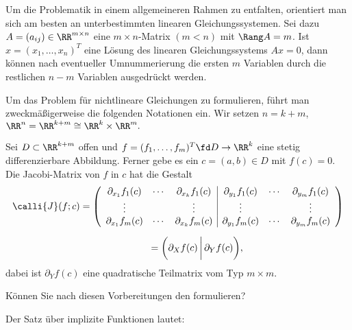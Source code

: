 Um die Problematik in einem allgemeineren Rahmen zu entfalten,   
orientiert man sich am besten an unterbestimmten 
linearen Gleichungssystemen. Sei dazu $A=(a_{ij})\in \RR^{m\times n}$ 
eine $m\times n$-Matrix $(m<n)$ mit $\Rang A =m$. 
Ist $x=(x_1,\ldots,x_n)^T$ eine Lösung des linearen Gleichungssystems 
$Ax=0$, dann können nach eventueller Umnummerierung die ersten $m$ Variablen 
durch die restlichen $n-m$ Variablen ausgedrückt werden. 

Um das Problem für nichtlineare Gleichungen zu formulieren, führt 
man zweckmäßigerweise die folgenden Notationen ein. 
Wir setzen $n=k+m$, $\RR^n =\RR^{k+m} \cong \RR^k \times \RR^m.$ 

Sei $D\subset \RR^{k+m}$ offen und 
$f =(f_1,\ldots,f_m)^T \fd D\to\RR^k$ eine stetig differenzierbare 
Abbildung. Ferner gebe es ein $c =(a,b) \in D$ mit $f(c)=0$. 
Die Jacobi-Matrix von $f$ in $c$ hat die Gestalt
\begin{gather}
  \calli{J}(f;c) =
  \left( \begin{array}{ccc|ccc}
      \partial_{x_1} f_1 (c ) &\cdots& \partial_{x_k} f_1 (c) &   
      \partial_{y_1} f_1 (c ) &\cdots& \partial_{y_m} f_1 (c) \\
      \vdots & & \vdots & \vdots &  & \vdots \\
      \partial_{x_1} f_m (c ) &\cdots& \partial_{x_k} f_m (c) &   
      \partial_{y_1} f_m (c ) &\cdots& \partial_{y_m} f_m (c) 
    \end{array} \right)  \notag \\[2mm]
  \rule{1.3cm}{0cm}= 
  \bigg( \partial_X f(c) \, \bigg| \,\partial_Y f(c) \bigg), \notag
\end{gather}
dabei ist $\partial_Y f(c)$ eine quadratische Teilmatrix 
vom Typ $m\times m$.

\begin{frage}
  Können Sie nach diesen Vorbereitungen den 
   formulieren?
\end{frage}

\begin{antwort}
  Der Satz über implizite Funktionen lautet: 

  \medskip\noindent
\end{antwort}


